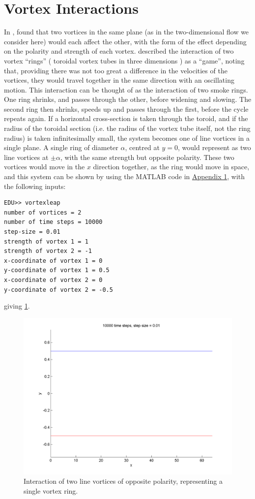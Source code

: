 \documentclass[10pt, a4paper]{article}
\numberwithin{equation}{section}
\begin{document}
\section{Vortex Interactions}
In \citeyear{helmholtz67}, \citeauthor{helmholtz67} found that two vortices in the same plane (as in the two-dimensional flow we consider here) would each affect the other, with the form of the effect depending on the polarity and strength of each vortex.
\citeauthor{helmholtz67} described the interaction of two vortex ``rings'' ( toroidal vortex tubes in three dimensions \citep{saffman92}) as a ``game'', noting that, providing there was not too great a difference in the velocities of the vortices, they would travel together in the same direction with an oscillating motion.
This interaction can be thought of as the interaction of two smoke rings.
One ring shrinks, and passes through the other, before widening and slowing.
The second ring then shrinks, speeds up and passes through the first, before the cycle repeats again.
If a horizontal cross-section is taken through the toroid, and if the radius of the toroidal section (i.e. the radius of the vortex tube itself, not the ring radius) is taken infinitesimally small, the system becomes one of line vortices in a single plane. 
A single ring of diameter $\alpha$, centred at $y=0$, would represent as two line vortices at $\pm\alpha$, with the same strength but opposite polarity.
These two vortices would move in the $x$ direction together, as the ring would move in space, and this system can be shown by using the MATLAB code in \hyperref[sec:ap1]{Appendix 1}, with the following inputs:
\begin{verbatim}
EDU>> vortexleap
number of vortices = 2
number of time steps = 10000
step-size = 0.01
strength of vortex 1 = 1
strength of vortex 2 = -1
x-coordinate of vortex 1 = 0
y-coordinate of vortex 1 = 0.5
x-coordinate of vortex 2 = 0
y-coordinate of vortex 2 = -0.5
\end{verbatim}
giving \cref{fig:2vort}.
\begin{figure}[ht]
\includegraphics[width=\textwidth]{2vort}
\caption{Interaction of two line vortices of opposite polarity, representing a single vortex ring.}
\label{fig:2vort}
\end{figure}
\end{document}

